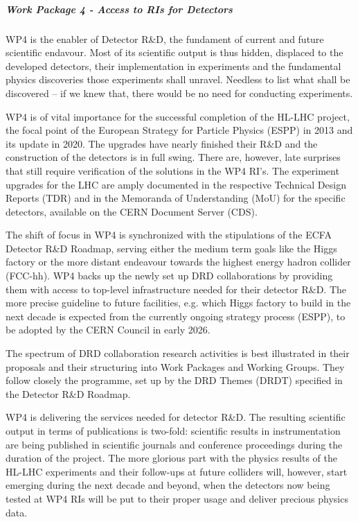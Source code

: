 %
% 
\subparagraph{Work Package 4 - Access to RIs for Detectors} \mbox{}

WP4 is the enabler of Detector R\&D, the fundament of current and future scientific endavour. Most of its scientific output is thus hidden, displaced to the developed detectors, their implementation in experiments and the fundamental physics discoveries those experiments shall unravel. Needless to list what shall be discovered – if we knew that, there would be no need for conducting experiments.

WP4 is of vital importance for the successful completion of the HL-LHC project, the focal point of the European Strategy for Particle Physics (ESPP) in 2013 and its update in 2020. The upgrades have nearly finished their R\&D and the construction of the detectors is in full swing. There are, however, late surprises that still require verification of the solutions in the WP4 RI’s. The experiment upgrades for the LHC are amply documented in the respective Technical Design Reports (TDR) and in the Memoranda of Understanding (MoU) for the specific detectors, available on the CERN Document Server (CDS).

The shift of focus in WP4 is synchronized with the stipulations of the ECFA Detector R\&D Roadmap, serving either the medium term goals like the Higgs factory or the more distant endeavour towards the highest energy hadron collider (FCC-hh). WP4 backs up the newly set up DRD collaborations by providing them with access to top-level infrastructure needed for their detector R\&D. The more precise guideline to future facilities, e.g. which Higgs factory to build in the next decade is expected from the currently ongoing strategy process (ESPP), to be adopted by the CERN Council in early 2026.

The spectrum of DRD collaboration research activities is best illustrated in their proposals and their structuring into Work Packages and Working Groups. They follow closely the programme, set up by  the DRD Themes (DRDT) specified in the Detector R\&D Roadmap.

WP4 is delivering the services needed for detector R\&D. The resulting scientific output in terms of publications is two-fold: scientific results in instrumentation are being published in scientific journals and conference proceedings during the duration of the project. The more glorious part with the physics results of the HL-LHC experiments and their follow-ups at future colliders will, however, start emerging during the next decade and beyond, when the detectors now being tested at WP4 RIs will be put to their proper usage and deliver precious physics data.
